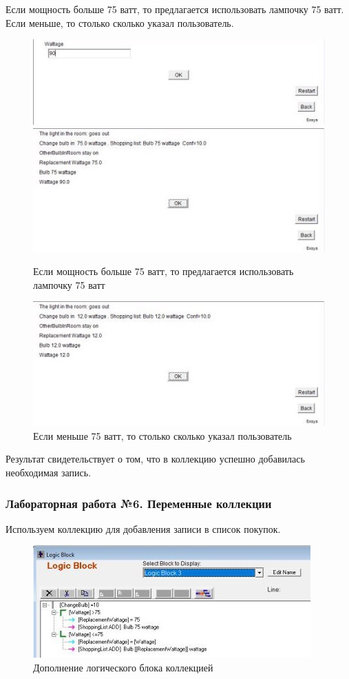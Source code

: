 \documentclass[14pt,a4paper,report]{report}
\begin{document}
Если мощность больше 75 ватт, то предлагается использовать лампочку 75 ватт. Если меньше, то столько сколько указал пользователь.

\begin{figure}[ht!]
	\includegraphics[width=.45\textwidth]{images/5_2.jpg}\hfill
	\includegraphics[width=.45\textwidth]{images/5_3.jpg}
	\caption{Если мощность больше 75 ватт, то предлагается использовать лампочку 75 ватт}
\end{figure}

\clearpage

\begin{figure}[h!]
	\includegraphics[width=.60\textwidth]{images/5_5.jpg}
	\caption{Если меньше 75 ватт, то столько сколько указал пользователь}
\end{figure}

Результат свидетельствует о том, что в коллекцию успешно добавилась необходимая запись.


\subsubsection{Лабораторная работа №6. Переменные коллекции}

Используем коллекцию для добавления записи в список покупок. 

\begin{figure}[h!]
	\centering
	\includegraphics[scale = 1.1]{images/6_1.jpg}
	\caption{Дополнение логического блока коллекцией}
\end{figure}
\end{document}
